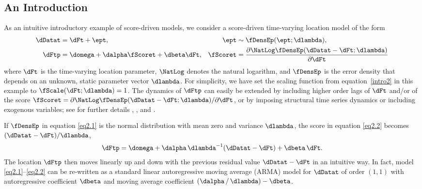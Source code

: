 \subsection{An Introduction} \label{sec2.1}

As an intuitive introductory example of score-driven models, we
consider a score-driven time-varying location model of the form
\begin{align}
    \label{eq2.1}
    \dDatat &= \dFt + \ept,
    &
    \ept &\sim \fDensEp(\ept; \dlambda),
    \\
    \label{eq2.2}
    \dFtp &= \domega + \dalpha \fScoret + \dbeta\dFt,
    &
    \fScoret &=\frac{\partial \NatLog \fDensEp(\dDatat - \dFt; \dlambda)}{\partial\dFt}
\end{align}
where $\dFt$ is the time-varying location parameter, $\NatLog$ denotes the natural logarithm, and $\fDensEp$ is the error density that depends on an unknown, static parameter vector $\dlambda$. 
For simplicity, we have set the scaling function from equation~\eqref{intro2} in this example to $\fScale(\dFt; \dlambda) = 1$.
The dynamics of $\dFtp$ can easily be extended by including higher order lags of $\dFt$ and/or of the score $\fScoret = \partial\NatLog\fDensEp(\dDatat-\dFt;\dlambda)/\partial \dFt$, or by imposing structural time series dynamics or including exogenous variables; see for further details \citet{CKL2013}, \citet{harveyluati2014}, and \citet{ordkoehlersnyder1997}.



If $\fDensEp$ in equation \eqref{eq2.1} is the normal distribution with mean zero and variance $\dlambda$, the score in equation \eqref{eq2.2} becomes $(\dDatat - \dFt)/\dlambda$,
\[
	\dFtp = \domega + \dalpha\,\dlambda^{-1}(\dDatat - \dFt) + \dbeta\,\dFt.
\] 
The location $\dFtp$ then moves linearly up and down with the previous residual value $\dDatat - \dFt$ in an intuitive way. In fact, model \eqref{eq2.1}--\eqref{eq2.2} can be re-written as a standard linear autoregressive moving average (ARMA) model for $\dDatat$ of order $(1,1)$ with autoregressive coefficient $\dbeta$ and moving average coefficient $(\dalpha \, / \, \dlambda)-\dbeta$.

